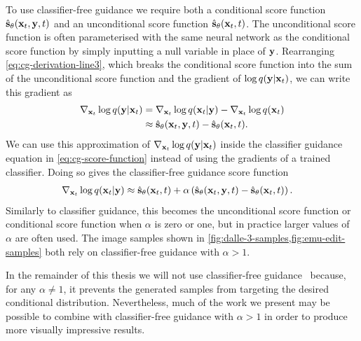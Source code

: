 To use classifier-free guidance we require both a conditional score function $\hat{{\mathbf{s}}}_\theta({\mathbf{x}}_t, {\mathbf{y}}, t)$ and an unconditional score function $\hat{{\mathbf{s}}}_\theta({\mathbf{x}}_t, t)$. The unconditional score function is often parameterised with the same neural network as the conditional score function by simply inputting a null variable in place of ${\mathbf{y}}$. Rearranging \cref{eq:cg-derivation-line3}, which breaks the conditional score function into the sum of the unconditional score function and the gradient of $\log q({\mathbf{y}}|{\mathbf{x}}_t)$, we can write this gradient as
\begin{align}
    \nabla_{{\mathbf{x}}_t} \log q({\mathbf{y}}|{\mathbf{x}}_t) &= \nabla_{{\mathbf{x}}_t} \log q({\mathbf{x}}_t|{\mathbf{y}}) - \nabla_{{\mathbf{x}}_t} \log q({\mathbf{x}}_t) \\
    &\approx \hat{{\mathbf{s}}}_\theta({\mathbf{x}}_t, {\mathbf{y}}, t) - \hat{{\mathbf{s}}}_\theta({\mathbf{x}}_t, t).
\end{align}
We can use this approximation of $\nabla_{{\mathbf{x}}_t} \log q({\mathbf{y}}|{\mathbf{x}}_t)$ inside the classifier guidance equation in \cref{eq:cg-score-function} instead of using the gradients of a trained classifier. Doing so gives the classifier-free guidance score function
\begin{align}
    \nabla_{{\mathbf{x}}_t} \log q({\mathbf{x}}_t|{\mathbf{y}}) &\approx \hat{{\mathbf{s}}}_\theta({\mathbf{x}}_t, t) + \alpha \left( \hat{{\mathbf{s}}}_\theta({\mathbf{x}}_t, {\mathbf{y}}, t) - \hat{{\mathbf{s}}}_\theta({\mathbf{x}}_t, t) \right). \label{eq:cfg-score-function}
\end{align}
Similarly to classifier guidance, this becomes the unconditional score function or conditional score function when $\alpha$ is zero or one, but in practice larger values of $\alpha$ are often used. The image samples shown in \cref{fig:dalle-3-samples,fig:emu-edit-samples} both rely on classifier-free guidance with $\alpha > 1$. 

In the remainder of this thesis we will not use classifier-free guidance~\citep{ho2022classifier} because, for any $\alpha \neq 1$, it prevents the generated samples from targeting the desired conditional distribution. Nevertheless, much of the work we present may be possible to combine with classifier-free guidance with $\alpha>1$ in order to produce more visually impressive results.
